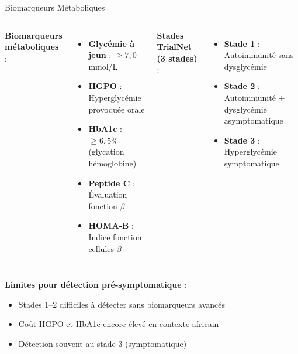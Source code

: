 \documentclass[11pt, aspectratio=169]{beamer}
\begin{document}
\begin{frame}{Biomarqueurs Métaboliques}
  \begin{columns}[T]
    \textbf{\color{accent2} Biomarqueurs métaboliques} :
    \begin{itemize}
      \item \textbf{Glycémie à jeun} : $\geq 7,0$ mmol/L
      \item \textbf{HGPO} : Hyperglycémie provoquée orale
      \item \textbf{HbA1c} : $\geq 6,5\%$ (glycation hémoglobine)
      \item \textbf{Peptide C} : Évaluation fonction $\beta$
      \item \textbf{HOMA-B} : Indice fonction cellules $\beta$
    \end{itemize}
    
    \textbf{\color{accent2} Stades TrialNet (3 stades)} :
    \begin{itemize}
      \item \textbf{Stade 1} : Autoimmunité sans dysglycémie
      \item \textbf{Stade 2} : Autoimmunité + dysglycémie asymptomatique
      \item \textbf{Stade 3} : Hyperglycémie symptomatique
    \end{itemize}
  \end{columns}
  
  \vspace{1em}
  
  \textbf{\textcolor{accent1}{Limites pour détection pré-symptomatique}} :
  \begin{itemize}
    \item Stades 1--2 difficiles à détecter sans biomarqueurs avancés
    \item Coût HGPO et HbA1c encore élevé en contexte africain
    \item Détection souvent au stade 3 (symptomatique)
  \end{itemize}
\end{frame}
\end{document}
